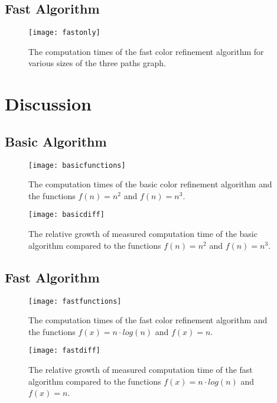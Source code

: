 \documentclass[twoside]{article}
\begin{document}
\begin{multicols}{2}
\subsection{Fast Algorithm}

\begin{figure}[H]
	\texttt{[image: fastonly]}
	\caption{The computation times of the fast color refinement algorithm for various sizes of the three paths graph.}
	\label{fig:fastonly}
\end{figure}

\section{Discussion} %
\label{disc}

\subsection{Basic Algorithm}

\begin{figure}[H]
	\texttt{[image: basicfunctions]}
	\caption{The computation times of the basic color refinement algorithm and the functions $f(n)=n^2$ and $f(n)=n^3$.}
	\label{fig:basicfunctions}
\end{figure}

\begin{figure}[H]
	\texttt{[image: basicdiff]}
	\caption{The relative growth of measured computation time of the basic algorithm compared to the functions $f(n)=n^2$ and $f(n)=n^3$.}
	\label{fig:basicgrowth}
\end{figure}

\subsection{Fast Algorithm}

\begin{figure}[H]
	\texttt{[image: fastfunctions]}
	\caption{The computation times of the fast color refinement algorithm and the functions $f(x)=n\cdot log(n)$ and $f(x)=n$.}
	\label{fig:fastgrowth}
\end{figure}

\begin{figure}[H]
	\texttt{[image: fastdiff]}
	\caption{The relative growth of measured computation time of the fast algorithm compared to the functions $f(x)=n\cdot log(n)$ and $f(x)=n$.}
	\label{fig:fastfunctions}
\end{figure}


\end{multicols}
\end{document}
